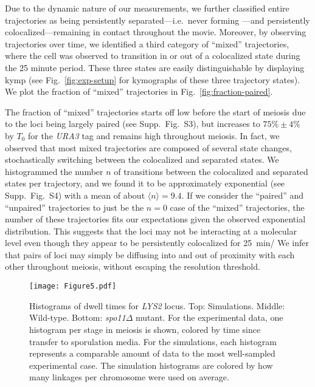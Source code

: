 \documentclass[9pt,twocolumn,twoside,lineno]{pnas-new}
\begin{document}
Due to the dynamic nature of our measurements, we further classified entire trajectories as being persistently separated---i.e.\ never forming ---and persistently colocalized---remaining in contact throughout the movie.
Moreover, by observing trajectories over time, we identified a third category of ``mixed'' trajectories, where the cell was observed to transition in or out of a colocalized state during the 25 minute period. These three states are easily distinguishable by displaying kymp (see Fig.~\ref{fig:exp-setup}  for kymographs of these three trajectory states).
We plot the fraction of ``mixed'' trajectories in Fig.~\ref{fig:fraction-paired}.

The fraction of ``mixed'' trajectories starts off low before the start of meiosis due to the loci being largely paired (see Supp.\ Fig.\ S3), but increases to $75\%\pm4\%$ by $T_0$ for the \textit{URA3} tag and remains high throughout meiosis.
In fact, we observed that most mixed trajectories are composed of several state changes, stochastically switching between the colocalized and separated states.
We histogrammed the number $n$ of transitions between the colocalized and separated  states per trajectory, and we found it to be approximately exponential (see Supp.\ Fig.\ S4) with a mean of about $\langle{}n\rangle{} = 9.4$.
If we consider the ``paired'' and ``unpaired'' trajectories to just be the $n=0$ case of the ``mixed'' trajectories, the number of these trajectories fits our expectations given the observed exponential distribution.
This suggests that the loci may not be interacting at a molecular level even though  they appear to be persistently colocalized for \SI{25}{\minute}/ We infer that  pairs of loci may simply be diffusing into and out of proximity with each other throughout meiosis, without escaping the resolution threshold.

\begin{figure*}[t!]
\centering
\texttt{[image: Figure5.pdf]}
\caption{Histograms of dwell times for \textit{LYS2} locus. Top: Simulations. Middle: Wild-type. Bottom: \textit{spo11$\Delta$} mutant.  For the experimental data, one histogram per stage in meiosis is shown, colored by time since transfer to sporulation media. For the simulations, each histogram represents a comparable amount of data to the most well-sampled experimental case. The simulation histograms are colored by how many linkages per chromosome were used on average.
}\label{fig:pair-unpair}
\end{figure*}
\end{document}
